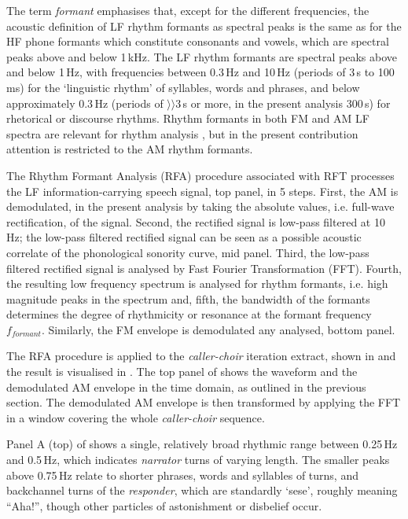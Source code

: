 \documentclass[output=paper,colorlinks,citecolor=brown]{langscibook}
\begin{document}
The term \textit{formant} emphasises that, except for the different frequencies, the acoustic definition of LF rhythm formants as spectral peaks is the same as for the HF phone formants which constitute consonants and vowels, which are spectral peaks above and below 1\,kHz. The LF rhythm formants are spectral peaks above and below 1\,Hz, with frequencies between 0.3\,Hz and 10\,Hz (periods of 3\,s to 100\,ms) for the `linguistic rhythm' \citep{libermanprince1977} of syllables, words and phrases, and below approximately 0.3\,Hz (periods of $\rangle\rangle$3\,s or more, in the present analysis 300\,s) for rhetorical or discourse rhythms. Rhythm formants in both FM and AM LF spectra are relevant for rhythm analysis \citep{gibbonsp2018, gibbonjipa2021, gibbon4urua2022, gibbonsp2022}, but in the present contribution attention is restricted to the AM rhythm formants.

The Rhythm Formant Analysis (RFA) procedure associated with RFT processes the LF information-carrying speech signal,  top panel, in 5 steps. First, the AM is demodulated, in the present analysis by taking the absolute values, i.e. full-wave rectification, of the signal. Second, the rectified signal is low-pass filtered at 10 Hz; the low-pass filtered rectified signal can be seen as a possible acoustic correlate of the phonological sonority curve,  mid panel. Third, the low-pass filtered rectified signal is analysed by Fast Fourier Transformation (FFT). Fourth, the resulting low frequency spectrum is analysed for rhythm formants, i.e. high magnitude peaks in the spectrum and, fifth, the bandwidth of the formants determines the degree of rhythmicity or resonance at the formant frequency $f_{formant}$. Similarly, the FM envelope is demodulated any analysed,  bottom panel.

The RFA procedure is applied to the \textit{caller-choir} iteration extract, shown in  and the result is visualised in . The top panel of  shows the waveform and the demodulated AM envelope in the time domain, as outlined in the previous section. The demodulated AM envelope is then transformed by applying the FFT in a window covering the whole \textit{caller-choir} sequence.

Panel A (top) of  shows a single, relatively broad rhythmic range between 0.25\,Hz and 0.5\,Hz, which indicates \textit{narrator} turns of varying length. The smaller peaks above 0.75\,Hz relate to shorter phrases, words and syllables of turns, and backchannel turns of the \textit{responder}, which are standardly `sese', roughly meaning ``Aha!'', though other particles of astonishment or disbelief occur.
\end{document}
